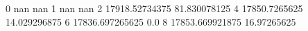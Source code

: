 0 nan nan
1 nan nan
2 17918.52734375 81.830078125
4 17850.7265625 14.029296875
6 17836.697265625 0.0
8 17853.669921875 16.97265625
